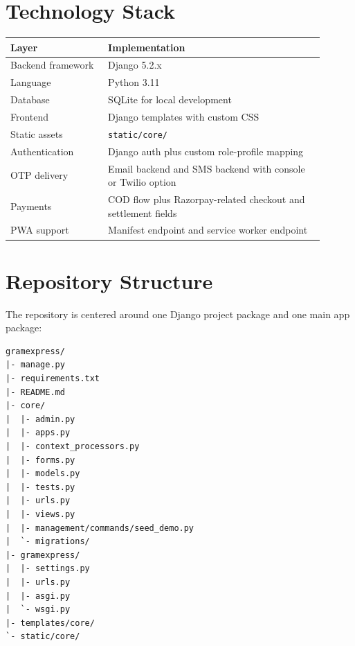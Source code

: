 \documentclass[12pt,a4paper]{article}
\begin{document}
\section{Technology Stack}
\begin{longtable}{|p{0.28\linewidth}|p{0.62\linewidth}|}
\hline
\textbf{Layer} & \textbf{Implementation} \\
\hline
Backend framework & Django 5.2.x \\
\hline
Language & Python 3.11 \\
\hline
Database & SQLite for local development \\
\hline
Frontend & Django templates with custom CSS \\
\hline
Static assets & \texttt{static/core/} \\
\hline
Authentication & Django auth plus custom role-profile mapping \\
\hline
OTP delivery & Email backend and SMS backend with console or Twilio option \\
\hline
Payments & COD flow plus Razorpay-related checkout and settlement fields \\
\hline
PWA support & Manifest endpoint and service worker endpoint \\
\hline
\end{longtable}

\section{Repository Structure}
The repository is centered around one Django project package and one main app package:

\begin{lstlisting}[style=plaincode]
gramexpress/
|- manage.py
|- requirements.txt
|- README.md
|- core/
|  |- admin.py
|  |- apps.py
|  |- context_processors.py
|  |- forms.py
|  |- models.py
|  |- tests.py
|  |- urls.py
|  |- views.py
|  |- management/commands/seed_demo.py
|  `- migrations/
|- gramexpress/
|  |- settings.py
|  |- urls.py
|  |- asgi.py
|  `- wsgi.py
|- templates/core/
`- static/core/
\end{lstlisting}
\end{document}
